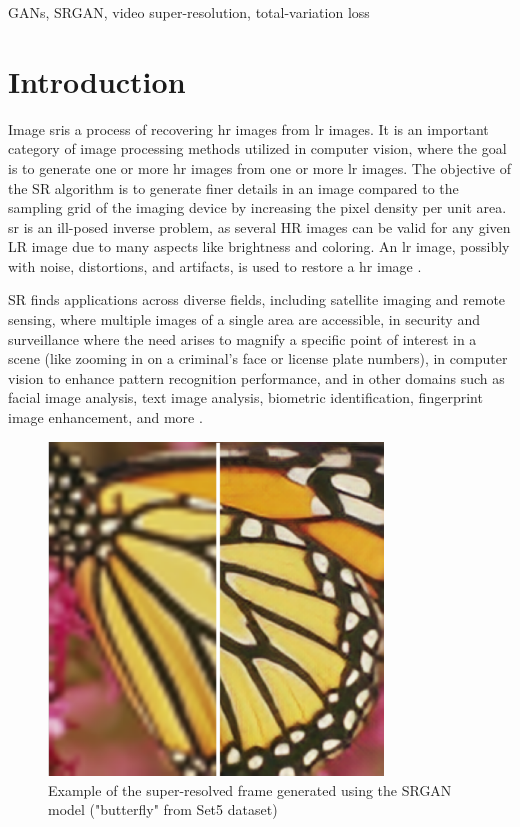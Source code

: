 \documentclass[conference]{IEEEtran}
\begin{document}
\begin{IEEEkeywords}
GANs, SRGAN, video super-resolution, total-variation loss
\end{IEEEkeywords}

\section{Introduction}
Image \acrfull{sr}is a process of recovering \acrfull{hr} images from \acrfull{lr} images. It is an important category of image processing methods utilized in computer vision, where the goal is to generate one or more \acrshort{hr} images from one or more \acrshort{lr} images. The objective of the SR algorithm is to generate finer details in an image compared to the sampling grid of the imaging device by increasing the pixel density per unit area. \acrshort{sr} is an ill-posed inverse problem, as several HR images can be valid for any given LR image due to many aspects like brightness and coloring. An \acrshort{lr} image, possibly with noise, distortions, and artifacts, is used to restore a \acrshort{hr} image \cite{Hitchhiker_guide_super_res_2023, sr_ill_posed_2021}.

SR finds applications across diverse fields, including satellite imaging and remote sensing, where multiple images of a single area are accessible, in security and surveillance where the need arises to magnify a specific point of interest in a scene (like zooming in on a criminal's face or license plate numbers), in computer vision to enhance pattern recognition performance, and in other domains such as facial image analysis, text image analysis, biometric identification, fingerprint image enhancement, and more \cite{sr_technical_overview_2003}.

\begin{figure}[t]
	\centering
	\centerline{\includegraphics[width=8.9cm]{bfly}}
	\caption{Example of the super-resolved frame generated using the SRGAN model ("butterfly" from Set5 dataset)}
	\label{fig:example_sr_conclusion}
\end{figure}
\end{document}
